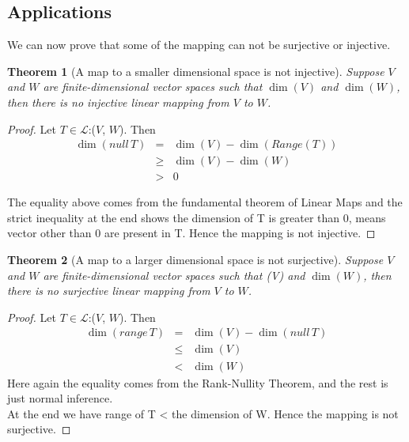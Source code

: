 \documentclass[a4paper,12pt,reqno,oneside]{amsart}
\newtheorem{theorem}{Theorem}
\theoremstyle{plain}
\numberwithin{equation}{section}
\begin{document}
\subsection{Applications}

We can now prove that some of the mapping can not be surjective or injective.
\begin{theorem}[A map to a smaller dimensional space is not injective]
	Suppose $V$ and $W$ are finite-dimensional vector spaces such that $\dim(V)$ and
	\gtr $\dim(W)$, then there is no injective linear mapping from $V$ to $W$.
\end{theorem}

\begin{proof}[Proof]
	Let $T\in\mathcal{L}$:($V$, $W$). Then
	\begin{eqnarray*}
	\dim(null\,T)&=&\dim(V) - \dim(Range (T)) \\
	& \geq & \dim(V) - \dim(W) \\
	& > & 0
	\end{eqnarray*}
	
	The equality above comes from the fundamental theorem of Linear Maps and the strict inequality at the end shows the dimension of T is greater than 0, means vector other than 0 are present in T. Hence the mapping is not injective.
\end{proof}

\begin{theorem}[A map to a larger dimensional space is not surjective]
Suppose $V$ and $W$ are finite-dimensional vector spaces such that \dim(V) and
	\ltr $\dim(W)$, then there is no surjective linear mapping from $V$ to $W$.
\end{theorem}
\begin{proof}[Proof]
	Let $T\in\mathcal{L}$:($V$, $W$). Then
	\begin{eqnarray*}
	\dim(range\,T)&=&\dim(V) - \dim(null\,T) \\
	& \leq & \dim(V) \\
	& < & \dim(W)
	\end{eqnarray*}
	Here again the equality comes from the Rank-Nullity Theorem, and the rest is just normal inference.\\
	At the end we have range of T < the dimension of W. Hence the mapping is not surjective.
\end{proof}
\end{document}
